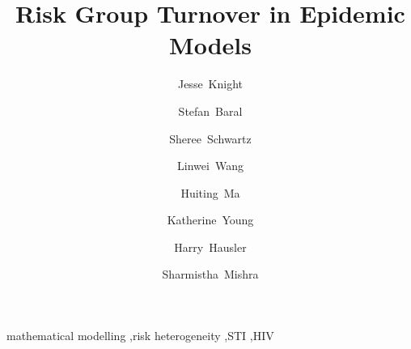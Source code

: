 \begin{frontmatter}
\title{Risk Group Turnover in Epidemic Models}
\author[MAP]{Jesse~Knight}
\author[JHU]{Stefan~Baral}
\author[JHU]{Sheree~Schwartz}
\author[MAP]{Linwei~Wang}
\author[MAP]{Huiting~Ma}
\author[THC]{Katherine~Young}
\author[THC]{Harry~Hausler}
\author[MAP,IDM,IHP,IMS]{Sharmistha~Mishra}
\address[MAP]{MAP Centre for Urban Health Solutions, Unity Health Toronto}
\address[JHU]{Deptartment of Epidemiology, Johns Hopkins Bloomberg School of Public Health}
\address[THC]{TB HIV Care, South Africa}
\address[IDM]{Department of Medicine, Division of Infectious Disease, University of Toronto}
\address[IHP]{Institute of Health Policy, Management and Evaluation,
  Dalla Lana School of Public Health, University of Toronto}
\address[IMS]{Instituof Medical Sciences, University of Toronto}
\begin{abstract}
  
\end{abstract}
\begin{keyword}
  mathematical modelling \sep risk heterogeneity \sep STI \sep HIV
\end{keyword}
\end{frontmatter}
\clearpage
\setcounter{tocdepth}{2}
\tableofcontents
\clearpage
